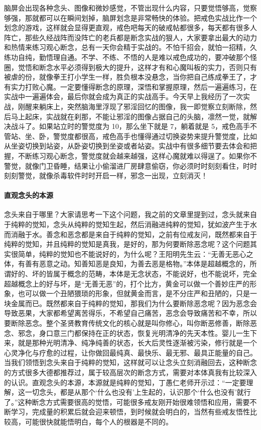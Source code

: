 脑屏会出现各种念头、图像和微妙感觉，不管出现什么内容，只要觉悟够高，觉察够强，那就都可以在瞬间划掉，脑屏划念是非常畅快的体验。把戒色实战比作一个划念的游戏，这样就会显得更直观，戒色吧每天的破戒帖都很多，每天都有很多人阵亡，那些久经战阵而没阵亡的老兵都是断念实战的狠人，大家要拿出最大的动力和热情来练习观心断念，总有一天你会精于实战的。不怕千招会，就怕一招精，久练功自纯，勤悟理自通。不学、不练、不悟的人是难以戒色成功的，要冲破那个怪圈，觉悟和断念水平必须得到极大的提升，这样才有和心魔叫板的实力，否则只有被虐的份，就像拳王打小学生一样，胜负根本没悬念，当你把自己练成拳王了，才有实力打败心魔。一定要懂得断念的原理，深悟和掌握原理，然后一遍遍练习，在实战中一遍遍体会，最后你就会成为真正的实战高手。今天早上我经历了一次实战，刚醒来躺床上，突然脑海里浮现了邪淫回忆的图像，我一即觉察立刻断除，然后马上起床，实战就在刹那，不能让邪淫的图像占据自己的头脑，凛然一觉，就解决战斗了。如果站立时的警觉度为 10，那么坐下就是 7，躺着就是 5，戒色高手不管站、坐、卧，警觉度都很高，戒色高手也懂得通过切换姿势来提升警觉度，比如从坐姿切换到站姿，从卧姿切换到坐姿或者站姿。实战中有很多细节要去体会和把握，不断练习观心断念，警觉度就会越来越强，这样心魔就难以得逞了。如果你不警觉，就像门卫昏睡，结果让小偷溜进厂房肆意偷窃，你必须时时刻刻看住，时时刻刻警觉，就像杀毒软件时时开启一样，邪念一出现，立刻消灭！

\paragraph{直观念头的本源}

念头来自于哪里？大家请思考一下这个问题，我之前的文章里提到过，念头就来自于纯粹的觉知，念头从纯粹的觉知生起，然后消融进纯粹的觉知，犹如波产生于水而消融于水。善念和恶念都是来自于纯粹的觉知，之前有位戒友问，既然都来自于纯粹的觉知，并且纯粹的觉知是真我，是好的，那为何要断除恶念呢？这个问题其实很简单，纯粹的觉知也不能说好的，为什么呢？王阳明先生云：“无善无恶心之体，有善有恶意之动。知善知恶是良知，为善去恶是格物。”本体是超越概念的，所谓好的、坏的皆属于概念的范畴，本体是无念状态，不能说好，也不能说坏，完全超越概念上的好与坏，是“无善无恶”的，打个比方，黄金可以做一个善妙庄严的形象，也可以做一个丑陋猥琐的形象，但就黄金而言，是不分庄严和丑陋的，只是一块金属而已。既然都来自于纯粹的觉知，那我们为什么要断除恶念呢？因为恶念会导致恶果，大家都希望离苦得乐，不希望自己痛苦，恶念会导致痛苦和不幸，所以要断除恶念。整个圣贤教育传统文化的核心就是叫你修心，叫你断恶修善，断除恶念、邪念，身口意三门都保持在正的状态，恢复光明清净的先天本性。婴儿一生下来，就是那种光明清净、纯净纯善的状态，长大后灵性逐渐被污染，修行就是一个心灵净化与疗愈的过程，让你做回最纯真、最快乐、最无邪、最具正能量的自己。当我们领悟到念头来自于纯粹的觉知，这样就可以让念头立刻消融回去，这种断念的方式很多大德都推荐过，属于较高层次的断念方式，需要对本体真我有比较深入的认识。直观念头的本源，本源就是纯粹的觉知，丁愚仁老师开示过：“一定要理解，这一切念头，都是从那个‘什么也没有’上生起的，认识那个‘什么也没有’就行了。”这种断念方式需要很高的觉悟，可能很多戒友刚开始很难领悟和应用，需要不断学习，完成量的积累后就会迎来顿悟，到时候就会明白的，当然有些戒友悟性比较高，可能很快就能悟明白，每个人的根器是不同的。

